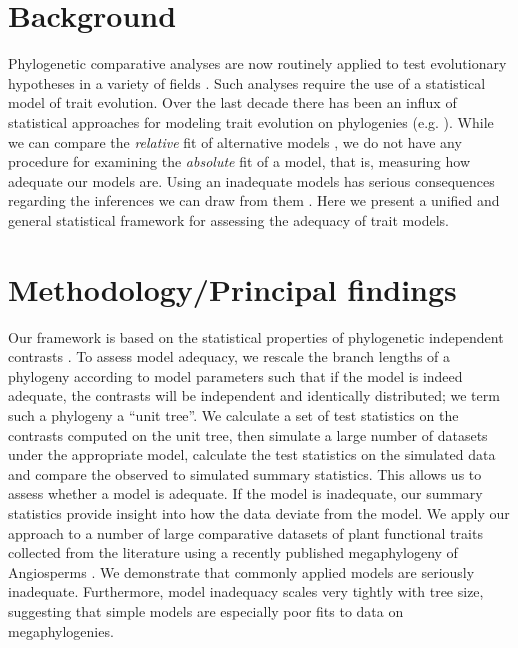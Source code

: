 \documentclass[a4paper,12pt]{article}
\begin{document}

\section*{Background}

Phylogenetic comparative analyses are now routinely applied to test evolutionary hypotheses in a variety of fields \citep{PennellHarmon}. Such analyses require the use of a statistical model of trait evolution. Over the last decade there has been an influx of statistical approaches for modeling trait evolution on phylogenies (e.g. \citep{ButlerKing2004, Omeara2006, Eastman2011, Beaulieu2012}). While we can compare the \textit{relative} fit of alternative models \citep{Harmon2010}, we do not have any procedure for examining the \textit{absolute} fit of a model, that is, measuring how adequate our models are. Using an inadequate models has serious consequences regarding the inferences we can draw from them \citep{Boettiger2012, SlaterPennell}. Here we present a unified and general statistical framework for assessing the adequacy of trait models.

\section*{Methodology/Principal findings}

Our framework is based on the statistical properties of phylogenetic independent contrasts \citep{Felsenstein1985}. To assess model adequacy, we rescale the branch lengths of a phylogeny according to model parameters such that if the model is indeed adequate, the contrasts will be independent and identically distributed; we term such a phylogeny a ``unit tree''. We calculate a set of test statistics on the contrasts computed on the unit tree, then simulate a large number of datasets under the appropriate model, calculate the test statistics on the simulated data and compare the observed to simulated summary statistics. This allows us to assess whether a model is adequate. If the model is inadequate, our summary statistics provide insight into how the data deviate from the model. We apply our approach to a number of large comparative datasets of plant functional traits collected from the literature using a recently published megaphylogeny of Angiosperms \citep{Zanne2013}. We demonstrate that commonly applied models are seriously inadequate. Furthermore, model inadequacy scales very tightly with tree size, suggesting that simple models are especially poor fits to data on megaphylogenies.
\end{document}

